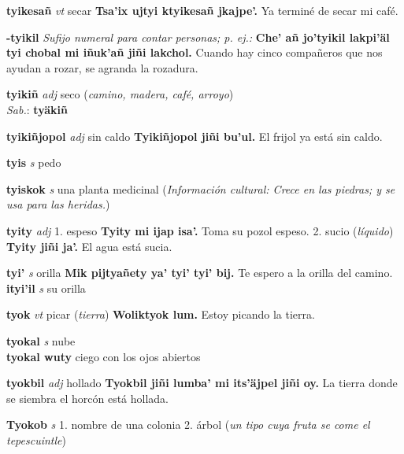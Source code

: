 \documentclass[10pt]{scrbook}
\newcommand{\entry}[1]{\textbf{#1}}
\newcommand{\onedefinition}[1]{#1.}
\newcommand{\nontranslationdef}[1]{\textit{#1}}
\newcommand{\partofspeech}[1]{\textit{#1}}
\newcommand{\spanishtranslation}[1]{#1}
\newcommand{\clarification}[1]{(\textit{#1})}
\newcommand{\cholexample}[1]{\textbf{#1}}
\newcommand{\exampletranslation}[1]{#1}
\newcommand{\dialectvariant}[1]{\\\textit{#1}:}
\newcommand{\dialectword}[1]{\textbf{#1}}
\newcommand{\culturalinformation}[1]{(\textit{#1})}
\newcommand{\secondaryentry}[1]{\\\textbf{#1}}
\newcommand{\secondpartofspeech}[1]{\textit{#1}}
\newcommand{\secondtranslation}[1]{#1}
\begin{document}
\begin{multicols}{2}
\entry{tyikesañ}
\partofspeech{vt}
\spanishtranslation{secar}
\cholexample{Tsa'ix ujtyi ktyikesañ jkajpe'.}
\exampletranslation{Ya terminé de secar mi café.}

\entry{-tyikil}
\nontranslationdef{Sufijo numeral para contar personas; p. ej.:}
\cholexample{Che' añ jo'tyikil lakpi'äl tyi chobal mi iñuk'añ jiñi lakchol.}
\exampletranslation{Cuando hay cinco compañeros que nos ayudan a rozar, se agranda la rozadura.}

\entry{tyikiñ}
\partofspeech{adj}
\spanishtranslation{seco}
\clarification{camino, madera, café, arroyo}
\dialectvariant{Sab.}
\dialectword{tyäkiñ}

\entry{tyikiñjopol}
\partofspeech{adj}
\spanishtranslation{sin caldo}
\cholexample{Tyikiñjopol jiñi bu'ul.}
\exampletranslation{El frijol ya está sin caldo.}

\entry{tyis}
\partofspeech{s}
\spanishtranslation{pedo}

\entry{tyiskok}
\partofspeech{s}
\spanishtranslation{una planta medicinal}
\culturalinformation{Información cultural: Crece en las piedras; y se usa para las heridas.}

\entry{tyity}
\partofspeech{adj}
\onedefinition{1}
\spanishtranslation{espeso}
\cholexample{Tyity mi ijap isa'.}
\exampletranslation{Toma su pozol espeso.}
\onedefinition{2}
\spanishtranslation{sucio}
\clarification{líquido}
\cholexample{Tyity jiñi ja'.}
\exampletranslation{El agua está sucia.}

\entry{tyi'}
\partofspeech{s}
\spanishtranslation{orilla}
\cholexample{Mik pijtyañety ya' tyi' tyi' bij.}
\exampletranslation{Te espero a la orilla del camino.}
\secondaryentry{ityi'il}
\secondpartofspeech{s}
\secondtranslation{su orilla}

\entry{tyok}
\partofspeech{vt}
\spanishtranslation{picar}
\clarification{tierra}
\cholexample{Woliktyok lum.}
\exampletranslation{Estoy picando la tierra.}

\entry{tyokal}
\partofspeech{s}
\spanishtranslation{nube}
\secondaryentry{tyokal wuty}
\secondtranslation{ciego con los ojos abiertos}

\entry{tyokbil}
\partofspeech{adj}
\spanishtranslation{hollado}
\cholexample{Tyokbil jiñi lumba' mi its'äjpel jiñi oy.}
\exampletranslation{La tierra donde se siembra el horcón está hollada.}

\entry{Tyokob}
\partofspeech{s}
\onedefinition{1}
\spanishtranslation{nombre de una colonia}
\onedefinition{2}
\spanishtranslation{árbol}
\clarification{un tipo cuya fruta se come el tepescuintle}


\end{multicols}
\end{document}

